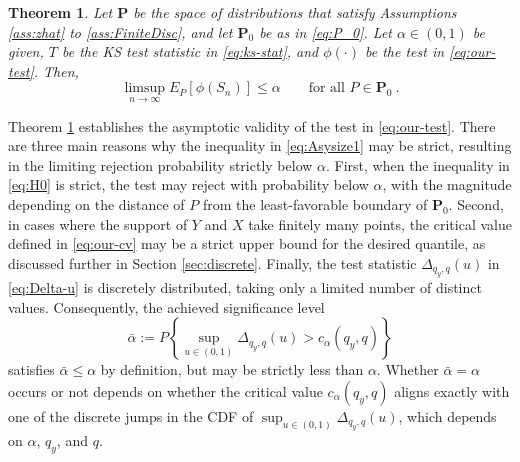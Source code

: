 \documentclass[11pt]{article}
\numberwithin{equation}{section}
\newtheorem{theorem}{Theorem}%
\begin{document}
\begin{theorem}\label{thm:SD-AsySz}
  Let $\mathbf P$ be the space of distributions that satisfy Assumptions \ref{ass:zhat} to \ref{ass:FiniteDisc}, and let $\mathbf P_{0}$ be as in \eqref{eq:P_0}. Let $\alpha\in(0,1)$ be given, $T$ be the KS test statistic in \eqref{eq:ks-stat}, and $\phi(\cdot)$ be the test in \eqref{eq:our-test}. Then, 
  \begin{equation} \label{eq:Asysize1}
    \limsup_{n \to \infty} E_{P}[\phi(S_n)]\le \alpha \qquad\text{for all }P \in \mathbf P_{0}~.
  \end{equation}
\end{theorem}

Theorem \ref{thm:SD-AsySz} establishes the asymptotic validity of the test in \eqref{eq:our-test}. There are three main reasons why the inequality in \eqref{eq:Asysize1} may be strict, resulting in the limiting rejection probability strictly below $\alpha$. First, when the inequality in \eqref{eq:H0} is strict, the test may reject with probability below $\alpha$, with the magnitude depending on the distance of $P$ from the least-favorable boundary of $\mathbf P_0$. Second, in cases where the support of $Y$ and $X$ take finitely many points, the critical value defined in \eqref{eq:our-cv} may be a strict upper bound for the desired quantile, as discussed further in Section \ref{sec:discrete}. Finally, the test statistic $\Delta_{q_y,q}(u)$ in \eqref{eq:Delta-u} is discretely distributed, taking only a limited number of distinct values. Consequently, the achieved significance level
\begin{equation}\label{eq:bar-alpha}
    \bar{\alpha} := P\left\lbrace \sup_{u \in (0,1)} \Delta_{q_y,q}(u) > c_{\alpha}(q_y, q) \right\rbrace
\end{equation}
satisfies $\bar{\alpha} \leq \alpha$ by definition, but may be strictly less than $\alpha$. Whether $\bar{\alpha} = \alpha$ occurs or not depends on whether the critical value $c_\alpha(q_y, q)$ aligns exactly with one of the discrete jumps in the CDF of $\sup_{u \in (0,1)} \Delta_{q_y,q}(u)$, which depends on $\alpha$, $q_y$, and $q$.
\end{document}
